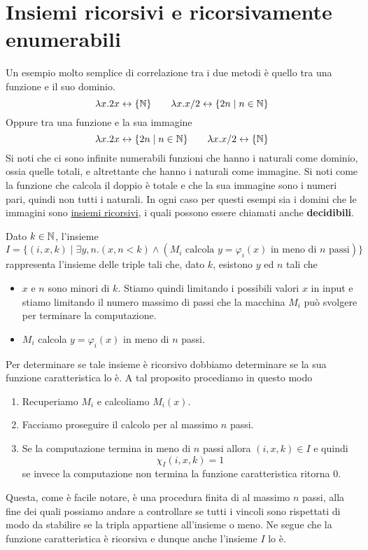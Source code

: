 \section{Insiemi ricorsivi e ricorsivamente enumerabili}
Un esempio molto semplice di correlazione tra i due metodi è
quello tra una funzione e il suo dominio.
\[
	\lambda x . 2 x \leftrightarrow \{ \mathbb{N} \} \qquad
	\lambda x . x / 2 \leftrightarrow \{ 2n \mid n \in \mathbb{N} \}
\]
Oppure tra una funzione e la sua immagine
\[
	\lambda x . 2 x \leftrightarrow \{ 2 n \mid n \in \mathbb{N} \}
	\qquad \lambda x . x / 2 \leftrightarrow \{ \mathbb{N} \}
\]
Si noti che ci sono infinite numerabili funzioni che hanno i
naturali come dominio, ossia quelle totali, e altrettante che
hanno i naturali come immagine. Si noti come la funzione che
calcola il doppio è totale e che la sua immagine sono i numeri
pari, quindi non tutti i naturali. In ogni caso per questi
esempi sia i domini che le immagini sono
\hyperref[def: relazione ricorsiva]{insiemi ricorsivi}, i quali
possono essere chiamati anche \textbf{decidibili}.

\begin{example}
	Dato $k \in \mathbb{N}$, l'insieme
	\[
		I = \{ (i, x, k) \mid \exists y, n . (x, n < k)
		\land (M_i \text{ calcola } y = \varphi_i (x)
		\text{ in meno di } n \text{ passi}) \}
	\]
	rappresenta l'insieme delle triple tali che, dato $k$,
	esistono $y$ ed $n$ tali che
	\begin{itemize}
		\item $x$ e $n$ sono minori di $k$. Stiamo quindi
		      limitando i possibili valori $x$ in input e stiamo
		      limitando il numero massimo di passi che la
		      macchina $M_i$ può svolgere per terminare la
		      computazione.
		\item $M_i$ calcola $y = \varphi_i (x)$ in meno di $n$
		      passi.
	\end{itemize}
	Per determinare se tale insieme è ricorsivo dobbiamo
	determinare se la sua funzione caratteristica lo è. A tal
	proposito procediamo in questo modo
	\begin{enumerate}
		\item Recuperiamo $M_i$ e calcoliamo $M_i(x)$.
		\item Facciamo proseguire il calcolo per al massimo $n$
		      passi.
		\item Se la computazione termina in meno di $n$ passi
		      allora $(i, x, k) \in I$ e quindi
		      \[ \chi_I (i, x, k) = 1 \]
		      se invece la computazione non termina la funzione
		      caratteristica ritorna $0$.
	\end{enumerate}
	Questa, come è facile notare, è una procedura finita di al
	massimo $n$ passi, alla fine dei quali possiamo andare a
	controllare se tutti i vincoli sono rispettati di modo da
	stabilire se la tripla appartiene all'insieme o meno. Ne
	segue che la funzione caratteristica è ricorsiva e dunque
	anche l'insieme $I$ lo è.
\end{example}

